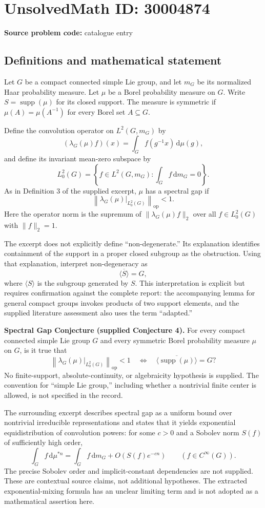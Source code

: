 \documentclass[11pt]{article}
\begin{document}
\section*{UnsolvedMath ID: 30004874}
\textbf{Source problem code:} catalogue entry
\subsection{Definitions and mathematical statement}
Let \(G\) be a compact connected simple Lie group, and let \(m_G\) be its normalized Haar probability measure. Let \(\mu\) be a Borel probability measure on \(G\). Write \(S=\operatorname{supp}(\mu)\) for its closed support. The measure is symmetric if \(\mu(A)=\mu(A^{-1})\) for every Borel set \(A\subseteq G\).

Define the convolution operator on \(L^2(G,m_G)\) by
\[
(\lambda_G(\mu)f)(x)=\int_G f(g^{-1}x)\,\mathrm{d}\mu(g),
\]
and define its invariant mean-zero subspace by
\[
L^2_0(G)=\left\{f\in L^2(G,m_G):\int_G f\,\mathrm{d}m_G=0\right\}.
\]
As in Definition 3 of the supplied excerpt, \(\mu\) has a spectral gap if
\[
\left\|\left.\lambda_G(\mu)\right|_{L^2_0(G)}\right\|_{\mathrm{op}}<1.
\]
Here the operator norm is the supremum of \(\|\lambda_G(\mu)f\|_2\) over all \(f\in L^2_0(G)\) with \(\|f\|_2=1\).

The excerpt does not explicitly define ``non-degenerate.'' Its explanation identifies containment of the support in a proper closed subgroup as the obstruction. Using that explanation, interpret non-degeneracy as
\[
\overline{\langle S\rangle}=G,
\]
where \(\langle S\rangle\) is the subgroup generated by \(S\). This interpretation is explicit but requires confirmation against the complete report: the accompanying lemma for general compact groups invokes products of two support elements, and the supplied literature assessment also uses the term ``adapted.''

\textbf{Spectral Gap Conjecture (supplied Conjecture 4).} For every compact connected simple Lie group \(G\) and every symmetric Borel probability measure \(\mu\) on \(G\), is it true that
\[
\left\|\left.\lambda_G(\mu)\right|_{L^2_0(G)}\right\|_{\mathrm{op}}<1
\quad\Longleftrightarrow\quad
\overline{\langle\operatorname{supp}(\mu)\rangle}=G?
\]
No finite-support, absolute-continuity, or algebraicity hypothesis is supplied. The convention for ``simple Lie group,'' including whether a nontrivial finite center is allowed, is not specified in the record.

The surrounding excerpt describes spectral gap as a uniform bound over nontrivial irreducible representations and states that it yields exponential equidistribution of convolution powers: for some \(c>0\) and a Sobolev norm \(S(f)\) of sufficiently high order,
\[
\int_G f\,\mathrm{d}\mu^{*n}
=\int_G f\,\mathrm{d}m_G+O\!\left(S(f)e^{-cn}\right)
\qquad(f\in C^\infty(G)).
\]
The precise Sobolev order and implicit-constant dependencies are not supplied. These are contextual source claims, not additional hypotheses. The extracted exponential-mixing formula has an unclear limiting term and is not adopted as a mathematical assertion here.
\end{document}
